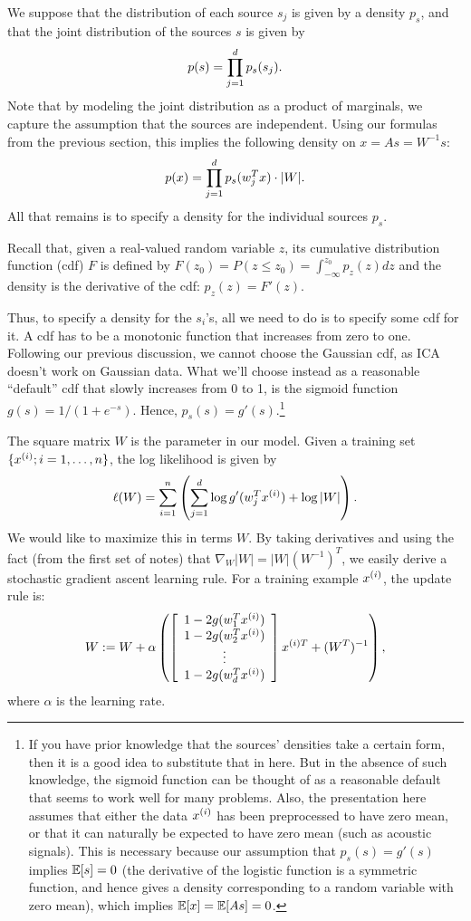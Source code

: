 \documentclass{article}
\begin{document}
We suppose that the distribution of each source $s_j$ is given by a density $p_s$, and
that the joint distribution of the sources $s$ is given by
\[
p(s) = \prod_{j=1}^{d} p_s(s_j).
\]
Note that by modeling the joint distribution as a product of marginals, we
capture the assumption that the sources are independent.  Using our formulas from
the previous section, this implies the following density on $x = As = W^{-1}s$:
\[
p(x) = \prod_{j=1}^{d} p_s(w_j^Tx) \cdot |W|.
\]
All that remains is to specify a density for the individual sources $p_s$.

Recall that, given a real-valued random variable $z$, its cumulative distribution function
(cdf) $F$ is defined by $F(z_0) = P(z\leq z_0) = \int_{-\infty}^{z_0} p_z(z) dz$ and the density
is the derivative of the cdf: $p_z(z) = F'(z)$.

Thus, to specify a density for the $s_i$'s, all we need to do is to specify some cdf
for it.  A cdf has to be a monotonic function that increases from zero to one.  Following
our previous discussion, we cannot choose the Gaussian cdf, as ICA
doesn't work on Gaussian data.  What we'll choose instead as a reasonable ``default'' cdf that slowly increases from 0 to 1, is the sigmoid function $g(s) = 1/(1+e^{-s})$.
Hence, $p_s(s) = g'(s)$.\footnote{If you have prior knowledge that the sources' densities
take a certain form, then it is a good idea to substitute that in here.  But in the absence
of such knowledge, the sigmoid function can be thought of as a reasonable default that seems to
work well for many problems. Also, the presentation here assumes that either the data ${x^{(i)}}$
has been preprocessed to have zero mean, or that it can naturally be expected to have zero
mean (such as acoustic signals).  This is necessary because our assumption that $p_s(s) = g'(s)$
implies $\mathbb{E}[s]=0$
(the derivative of the logistic function is a symmetric function, and hence gives a density
corresponding to a random variable with
zero mean), which implies $\mathbb{E}[x] = \mathbb{E}[As] = 0$.}

The square matrix $W$ is the parameter in our model. Given a training set $\{{x^{(i)}}; i=1,\ldots,{n}\}$, the log likelihood is given by
\[
\ell(W) = \sum_{i=1}^{n} \left(\sum_{j=1}^{d}\log g'(w_j^Tx^{(i)}) + \log |W|\right).
\]
We would like to maximize this in terms $W$.  By taking derivatives and using the fact (from the first set of notes) that $\nabla_W |W| = |W|(W^{-1})^T$, we easily derive a stochastic gradient ascent learning rule.  For a training example ${x^{(i)}}$, the update rule is:
\[
W := W + \alpha \left( \left[ \begin{array}{c} 1-2g(w_1^T{x^{(i)}}) \\ 1-2g(w_2^T{x^{(i)}}) \\ \vdots \\ 1-2g(w_{{d}}^T{x^{(i)}}) \end{array}\right] x^{(i)T} + (W^T)^{-1} \right),
\]
where $\alpha$ is the learning rate.
\end{document}
